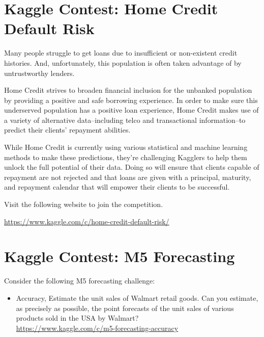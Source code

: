 \documentclass[11pt]{article}
\begin{document}
\newpage 


\section{Kaggle Contest: Home Credit Default Risk}

Many people struggle to get loans due to insufficient or non-existent credit histories. And, unfortunately, this population is often taken advantage of by untrustworthy lenders.

Home Credit strives to broaden financial inclusion for the unbanked population by providing a positive and safe borrowing experience. In order to make sure this underserved population has a positive loan experience, Home Credit makes use of a variety of alternative data--including telco and transactional information--to predict their clients' repayment abilities.

While Home Credit is currently using various statistical and machine learning methods to make these predictions, they're challenging Kagglers to help them unlock the full potential of their data. Doing so will ensure that clients capable of repayment are not rejected and that loans are given with a principal, maturity, and repayment calendar that will empower their clients to be successful.

Visit the following website to join the competition. 

\url{https://www.kaggle.com/c/home-credit-default-risk/}



\section{Kaggle Contest: M5 Forecasting}

Consider the following M5 forecasting challenge: 
\begin{itemize}
\item Accuracy, Estimate the unit sales of Walmart retail goods. Can you estimate, as precisely as possible, the point forecasts of the unit sales of various products sold in the USA by Walmart? \\
\url{https://www.kaggle.com/c/m5-forecasting-accuracy}
\end{itemize}
\end{document}

